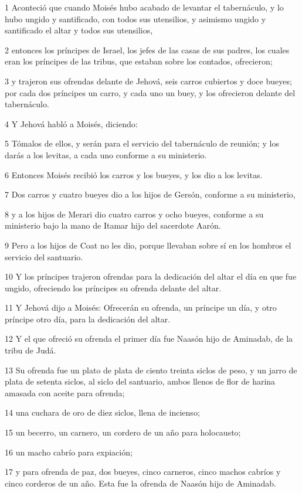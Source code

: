 \par 1 Aconteció que cuando Moisés hubo acabado de levantar el tabernáculo, y lo hubo ungido y santificado, con todos sus utensilios, y asimismo ungido y santificado el altar y todos sus utensilios, 
\par 2 entonces los príncipes de Israel, los jefes de las casas de sus padres, los cuales eran los príncipes de las tribus, que estaban sobre los contados, ofrecieron;
\par 3 y trajeron sus ofrendas delante de Jehová, seis carros cubiertos y doce bueyes; por cada dos príncipes un carro, y cada uno un buey, y los ofrecieron delante del tabernáculo.
\par 4 Y Jehová habló a Moisés, diciendo:
\par 5 Tómalos de ellos, y serán para el servicio del tabernáculo de reunión; y los darás a los levitas, a cada uno conforme a su ministerio.
\par 6 Entonces Moisés recibió los carros y los bueyes, y los dio a los levitas.
\par 7 Dos carros y cuatro bueyes dio a los hijos de Gersón, conforme a su ministerio,
\par 8 y a los hijos de Merari dio cuatro carros y ocho bueyes, conforme a su ministerio bajo la mano de Itamar hijo del sacerdote Aarón.
\par 9 Pero a los hijos de Coat no les dio, porque llevaban sobre sí en los hombros el servicio del santuario. 
\par 10 Y los príncipes trajeron ofrendas para la dedicación del altar el día en que fue ungido, ofreciendo los príncipes su ofrenda delante del altar.
\par 11 Y Jehová dijo a Moisés: Ofrecerán su ofrenda, un príncipe un día, y otro príncipe otro día, para la dedicación del altar.
\par 12 Y el que ofreció su ofrenda el primer día fue Naasón hijo de Aminadab, de la tribu de Judá.
\par 13 Su ofrenda fue un plato de plata de ciento treinta siclos de peso,  y un jarro de plata de setenta siclos, al siclo del santuario, ambos llenos de flor de harina amasada con aceite para ofrenda;
\par 14 una cuchara de oro de diez siclos,  llena de incienso;
\par 15 un becerro, un carnero, un cordero de un año para holocausto;
\par 16 un macho cabrío para expiación;
\par 17 y para ofrenda de paz, dos bueyes, cinco carneros, cinco machos cabríos y cinco corderos de un año. Esta fue la ofrenda de Naasón hijo de Aminadab.
